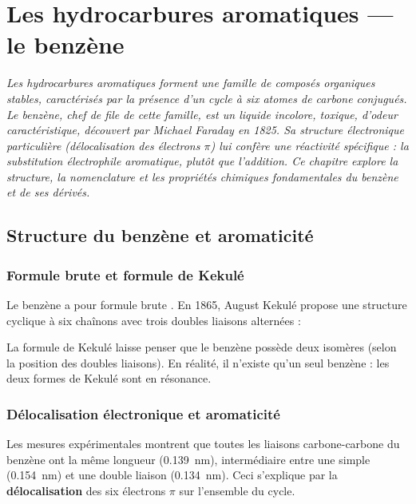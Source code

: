 \chapter{Les hydrocarbures aromatiques — le benzène}

\textit{Les hydrocarbures aromatiques forment une famille de composés organiques stables, caractérisés par la présence d'un cycle à six atomes de carbone conjugués. Le benzène, chef de file de cette famille, est un liquide incolore, toxique, d'odeur caractéristique, découvert par Michael Faraday en 1825. Sa structure électronique particulière (délocalisation des électrons $\pi$) lui confère une réactivité spécifique : la substitution électrophile aromatique, plutôt que l'addition. Ce chapitre explore la structure, la nomenclature et les propriétés chimiques fondamentales du benzène et de ses dérivés.}

\section{Structure du benzène et aromaticité}

\subsection{Formule brute et formule de Kekulé}

Le benzène a pour formule brute . En 1865, August Kekulé propose une structure cyclique à six chaînons avec trois doubles liaisons alternées :

\begin{illus}
\end{illus}

\begin{remarque}
La formule de Kekulé laisse penser que le benzène possède deux isomères (selon la position des doubles liaisons). En réalité, il n'existe qu'un seul benzène : les deux formes de Kekulé sont en résonance.
\end{remarque}

\subsection{Délocalisation électronique et aromaticité}

Les mesures expérimentales montrent que toutes les liaisons carbone-carbone du benzène ont la même longueur (\SI{0.139}{\nm}), intermédiaire entre une simple (\SI{0.154}{\nm}) et une double liaison (\SI{0.134}{\nm}). Ceci s'explique par la \textbf{délocalisation} des six électrons $\pi$ sur l'ensemble du cycle.

